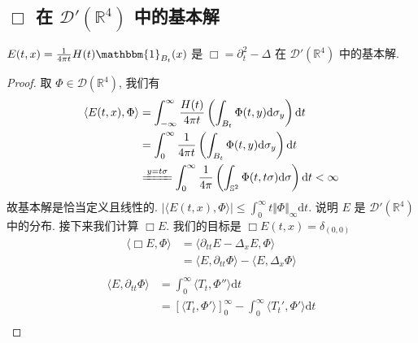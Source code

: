 \documentclass[11pt]{ctexart}[UTF8]
\begin{document}
\subsection{$\Box$ 在 $\mathscr{D}'(\mathbb{R}^{4})$ 中的基本解}
\begin{proposition}
    $E(t,x) = \frac{1}{4\pi t}H(t)\mathbbm{1}_{B_{t}}(x)$ 是 $\Box = \partial_t^2 - \Delta$ 在 $\mathscr{D}'(\mathbb{R}^{4})$ 中的基本解.
\end{proposition}
\begin{proof}
    取 $\Phi \in \mathscr{D}(\mathbb{R}^{4})$, 我们有
    \begin{equation*}
        \begin{aligned}
            \langle E(t,x), \Phi \rangle &= \int_{-\infty}^{\infty}\frac{H(t)}{4\pi t}\left( \int_{B_{t}}  \Phi(t,y) \mathrm{d}\sigma_{y}\right) \mathrm{d}t\\
                                         &= \int_{0}^{\infty}\frac{1}{4\pi t}\left( \int_{B_{t}}  \Phi(t,y) \mathrm{d}\sigma_{y}\right) \mathrm{d}t\\
                                         &\xlongequal{y=t\sigma} \int_{0}^{\infty}\frac{1}{4\pi}\left( \int_{\mathbb{S}^{2}}  \Phi(t,t\sigma) \mathrm{d}\sigma\right) \mathrm{d}t<\infty\\
        \end{aligned}
    \end{equation*}
    故基本解是恰当定义且线性的. $|\langle E(t,x), \Phi \rangle| \leq \int_{0}^{\infty} t \Vert \Phi\Vert_{\infty} \mathrm{d}t $. 说明 $E$ 是 $\mathscr{D}'(\mathbb{R}^{4})$ 中的分布. 
    接下来我们计算 $\Box E$. 我们的目标是 $\Box E(t,x) = \delta_{(0,0)}$ 
    \begin{equation*}
        \begin{aligned}
            \langle \Box E, \Phi \rangle &= \langle \partial_{tt} E-\Delta_{x}E, \Phi \rangle \\
                                         &= \langle E, \partial_{tt} \Phi \rangle - \langle E, \Delta_{x} \Phi \rangle \\
        \end{aligned}
    \end{equation*}
    \begin{equation*}
        \begin{aligned}
            \langle E, \partial_{tt} \Phi \rangle &= \int_{0}^{\infty} \langle T_{t}, \Phi'' \rangle \mathrm{d}t\\
                                                  &=\left[ \langle T_{t},\Phi'\rangle \right]_{0}^{\infty} - \int_{0}^{\infty} \langle T_{t}', \Phi' \rangle \mathrm{d}t\\

\end{aligned}
\end{equation*}
\end{proof}
\end{document}
